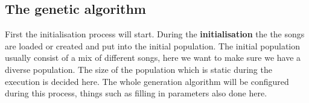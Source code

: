 \subsection{The genetic algorithm}

First the initialisation process will start. During the \textbf{initialisation} the the songs are loaded or created and put into the initial population. The initial population usually consist of a mix of different songs, here we want to make sure we have a diverse population. The size of the population which is static during the execution is decided here. The whole generation algorithm will be configured during this process, things such as filling in parameters also done here.